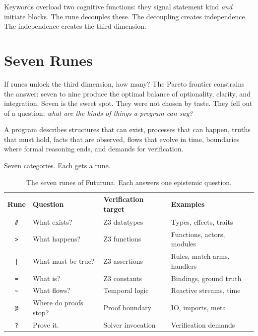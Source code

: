 \documentclass[11pt,a4paper]{article}
\begin{document}
Keywords overload two cognitive functions: they signal statement kind \emph{and} initiate blocks. The rune decouples these. The decoupling creates independence. The independence creates the third dimension.

\section{Seven Runes}

If runes unlock the third dimension, how many? The Pareto frontier constrains the answer: seven to nine produce the optimal balance of optionality, clarity, and integration. Seven is the sweet spot. They were not chosen by taste. They fell out of a question: \emph{what are the kinds of things a program can say?}

A program describes structures that can exist, processes that can happen, truths that must hold, facts that are observed, flows that evolve in time, boundaries where formal reasoning ends, and demands for verification.

Seven categories. Each gets a rune.

\begin{table}[H]
\centering
\caption{The seven runes of Futuruna. Each answers one epistemic question.}
\label{tab:runes}
\begin{tabular}{clll}
\toprule
Rune & Question & Verification target & Examples \\
\midrule
\texttt{\#} & What exists? & Z3 datatypes & Types, effects, traits \\
\texttt{>} & What happens? & Z3 functions & Functions, actors, modules \\
\texttt{|} & What must be true? & Z3 assertions & Rules, match arms, handlers \\
\texttt{=} & What is? & Z3 constants & Bindings, ground truth \\
\texttt{\textasciitilde} & What flows? & Temporal logic & Reactive streams, time \\
\texttt{@} & Where do proofs stop? & Proof boundary & IO, imports, meta \\
\texttt{?} & Prove it. & Solver invocation & Verification demands \\
\bottomrule
\end{tabular}
\end{table}
\end{document}
